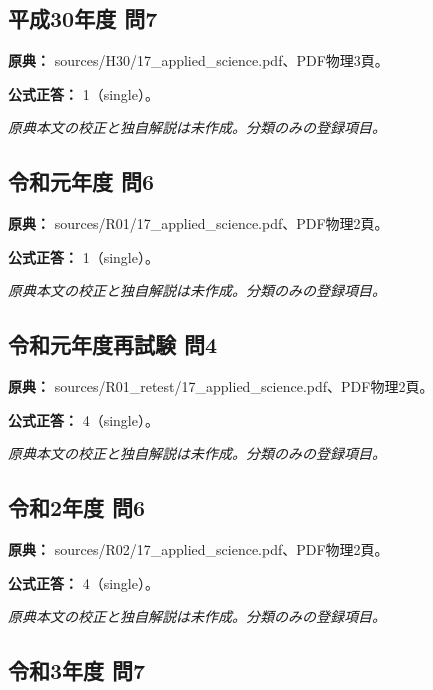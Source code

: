 \subsection{平成30年度 問7}
\label{q:h30-reg-applied-07}

\noindent\textbf{原典：} sources/H30/17\_applied\_science.pdf、PDF物理3頁。

\textbf{公式正答：} 1（single）。

\par\textit{原典本文の校正と独自解説は未作成。分類のみの登録項目。}

\subsection{令和元年度 問6}
\label{q:r01-reg-applied-06}

\noindent\textbf{原典：} sources/R01/17\_applied\_science.pdf、PDF物理2頁。

\textbf{公式正答：} 1（single）。

\par\textit{原典本文の校正と独自解説は未作成。分類のみの登録項目。}

\subsection{令和元年度再試験 問4}
\label{q:r01-ret-applied-04}

\noindent\textbf{原典：} sources/R01\_retest/17\_applied\_science.pdf、PDF物理2頁。

\textbf{公式正答：} 4（single）。

\par\textit{原典本文の校正と独自解説は未作成。分類のみの登録項目。}

\subsection{令和2年度 問6}
\label{q:r02-reg-applied-06}

\noindent\textbf{原典：} sources/R02/17\_applied\_science.pdf、PDF物理2頁。

\textbf{公式正答：} 4（single）。

\par\textit{原典本文の校正と独自解説は未作成。分類のみの登録項目。}

\subsection{令和3年度 問7}
\label{q:r03-reg-applied-07}

